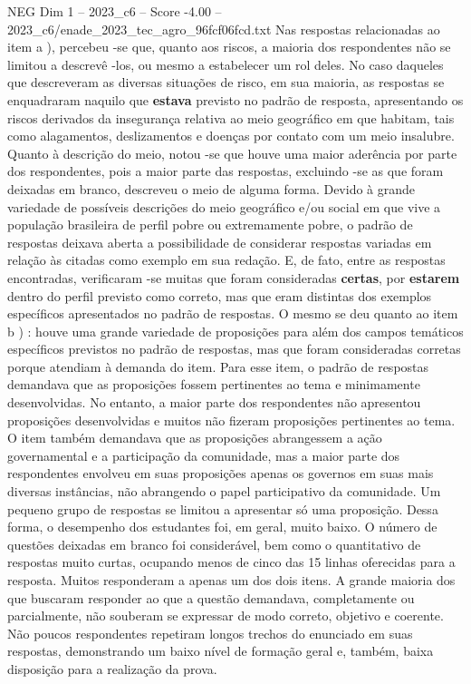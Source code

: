 \begin{textsample}{NEG Dim 1 – 2023\_c6 – Score -4.00 – 2023\_c6/enade\_2023\_tec\_agro\_96fcf06fcd.txt}
Nas respostas relacionadas ao item a ), percebeu -se que, quanto aos riscos, a maioria dos respondentes não se limitou a descrevê -los, ou mesmo a estabelecer um rol deles.
No caso daqueles que descreveram as diversas situações de risco, em sua maioria, as respostas se enquadraram naquilo que \textbf{estava} previsto no padrão de resposta, apresentando os riscos derivados da insegurança relativa ao meio geográfico em que habitam, tais como alagamentos, deslizamentos e doenças por contato com um meio insalubre.
Quanto à descrição do meio, notou -se que houve uma maior aderência por parte dos respondentes, pois a maior parte das respostas, excluindo -se as que foram deixadas em branco, descreveu o meio de alguma forma.
Devido à grande variedade de possíveis descrições do meio geográfico e/ou social em que vive a população brasileira de perfil pobre ou extremamente pobre, o padrão de respostas deixava aberta a possibilidade de considerar respostas variadas em relação às citadas como exemplo em sua redação.
E, de fato, entre as respostas encontradas, verificaram -se muitas que foram consideradas \textbf{certas}, por \textbf{estarem} dentro do perfil previsto como correto, mas que eram distintas dos exemplos específicos apresentados no padrão de respostas.
O mesmo se deu quanto ao item b ) : houve uma grande variedade de proposições para além dos campos temáticos específicos previstos no padrão de respostas, mas que foram consideradas corretas porque atendiam à demanda do item.
Para esse item, o padrão de respostas demandava que as proposições fossem pertinentes ao tema e minimamente desenvolvidas.
No entanto, a maior parte dos respondentes não apresentou proposições desenvolvidas e muitos não fizeram proposições pertinentes ao tema.
O item também demandava que as proposições abrangessem a ação governamental e a participação da comunidade, mas a maior parte dos respondentes envolveu em suas proposições apenas os governos em suas mais diversas instâncias, não abrangendo o papel participativo da comunidade.
Um pequeno grupo de respostas se limitou a apresentar só uma proposição.
Dessa forma, o desempenho dos estudantes foi, em geral, muito baixo.
O número de questões deixadas em branco foi considerável, bem como o quantitativo de respostas muito curtas, ocupando menos de cinco das 15 linhas oferecidas para a resposta.
Muitos responderam a apenas um dos dois itens.
A grande maioria dos que buscaram responder ao que a questão demandava, completamente ou parcialmente, não souberam se expressar de modo correto, objetivo e coerente.
Não poucos respondentes repetiram longos trechos do enunciado em suas respostas, demonstrando um baixo nível de formação geral e, também, baixa disposição para a realização da prova.

\end{textsample}
